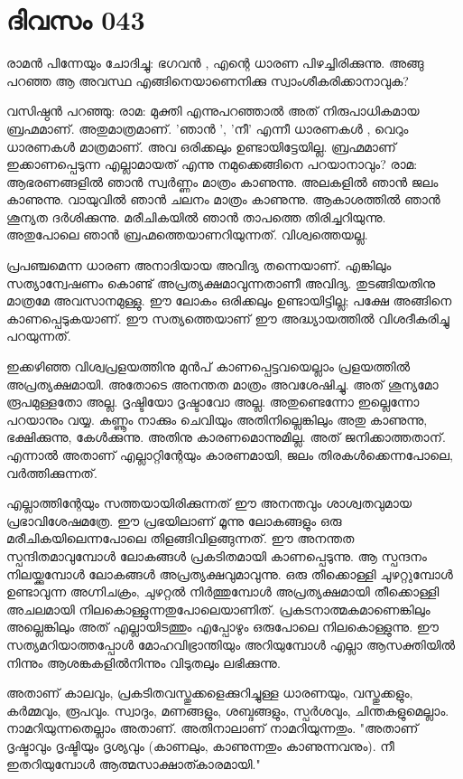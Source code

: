 \newpage
\section{ദിവസം 043}


രാമന്‍ പിന്നേയും ചോദിച്ചു: ഭഗവന്‍ , എന്റെ ധാരണ പിഴച്ചിരിക്കുന്നു. അങ്ങു പറഞ്ഞ ആ അവസ്ഥ എങ്ങിനെയാണെനിക്കു സ്വാംശീകരിക്കാനാവുക?

വസിഷ്ഠന്‍ പറഞ്ഞു: രാമ: മുക്തി എന്നുപറഞ്ഞാല്‍ അത്‌ നിരുപാധികമായ ബ്രഹ്മമാണ്‌. അതുമാത്രമാണ്‌.  'ഞാന്‍ ', 'നീ' എന്നീ ധാരണകള്‍ , വെറും ധാരണകള്‍ മാത്രമാണ്‌. അവ ഒരിക്കലും ഉണ്ടായിട്ടേയില്ല. ബ്രഹ്മമാണ്‌ ഇക്കാണപ്പെടുന്ന എല്ലാമായത്‌ എന്നു നമുക്കെങ്ങിനെ പറയാനാവും? രാമ: ആഭരണങ്ങളില്‍ ഞാന്‍ സ്വര്‍ണ്ണം മാത്രം കാണുന്നു. അലകളില്‍ ഞാന്‍ ജലം കാണുന്നു. വായുവില്‍ ഞാന്‍ ചലനം മാത്രം കാണുന്നു. ആകാശത്തില്‍ ഞാന്‍ ശൂന്യത ദര്‍ശിക്കുന്നു. മരീചികയില്‍ ഞാന്‍ താപത്തെ തിരിച്ചറിയുന്നു. അതുപോലെ ഞാന്‍ ബ്രഹ്മത്തെയാണറിയുന്നത്‌. വിശ്വത്തെയല്ല.

പ്രപഞ്ചമെന്ന ധാരണ അനാദിയായ അവിദ്യ തന്നെയാണ്‌. എങ്കിലും സത്യാന്വേഷണം കൊണ്ട്‌ അപ്രത്യക്ഷമാവുന്നതാണീ അവിദ്യ. തുടങ്ങിയതിനു മാത്രമേ അവസാനമുള്ളു. ഈ ലോകം ഒരിക്കലും ഉണ്ടായിട്ടില്ല; പക്ഷേ അങ്ങിനെ കാണപ്പെടുകയാണ്‌. ഈ സത്യത്തെയാണ്‌ ഈ അദ്ധ്യായത്തില്‍ വിശദീകരിച്ചു പറയുന്നത്‌. 

ഇക്കഴിഞ്ഞ വിശ്വപ്രളയത്തിനു മുന്‍പ്‌ കാണപ്പെട്ടവയെല്ലാം പ്രളയത്തില്‍ അപ്രത്യക്ഷമായി. അതോടെ അനന്തത മാത്രം അവശേഷിച്ചു. അത്‌ ശൂന്യമോ രൂപമുള്ളതോ അല്ല. ദൃഷ്ടിയോ ദൃഷ്ടാവോ അല്ല. അതുണ്ടെന്നോ ഇല്ലെന്നോ പറയാനും വയ്യ. കണ്ണൂം നാക്കും ചെവിയും അതിനില്ലെങ്കിലും അതു കാണുന്നു, ഭക്ഷിക്കുന്നു, കേള്‍ക്കുന്നു. അതിനു കാരണമൊന്നുമില്ല. അത്‌ ജനിക്കാത്തതാന്‌. എന്നാല്‍ അതാണ്‌ എല്ലാറ്റിന്റേയും കാരണമായി, ജലം തിരകള്‍ക്കെന്നപോലെ, വര്‍ത്തിക്കുന്നത്‌.

എല്ലാത്തിന്റേയും സത്തയായിരിക്കുന്നത്‌ ഈ അനന്തവും ശാശ്വതവുമായ പ്രഭാവിശേഷമത്രേ. ഈ പ്രഭയിലാണ്‌ മൂന്നു ലോകങ്ങളും ഒരു മരീചികയിലെന്നപോലെ തിളങ്ങിവിളങ്ങുന്നത്‌. ഈ അനന്തത സ്പന്ദിതമാവുമ്പോള്‍ ലോകങ്ങള്‍ പ്രകടിതമായി കാണപ്പെടുന്നു. ആ സ്പന്ദനം  നിലയ്ക്കുമ്പോള്‍ ലോകങ്ങള്‍ അപ്രത്യക്ഷവുമാവുന്നു. ഒരു തീക്കൊള്ളി ചുഴറ്റുമ്പോള്‍ ഉണ്ടാവുന്ന അഗ്നിചക്രം, ചുഴറ്റല്‍ നിര്‍ത്തുമ്പോള്‍ അപ്രത്യക്ഷമായി തീക്കൊള്ളി അചലമായി നിലകൊള്ളുന്നതുപോലെയാണിത്‌.  പ്രകടനാത്മകമാണെങ്കിലും  അല്ലെങ്കിലും അത്‌ എല്ലായിടത്തും എപ്പോഴും ഒരുപോലെ നിലകൊള്ളുന്നു. ഈ സത്യമറിയാത്തപ്പോള്‍ മോഹവിഭ്രാന്തിയും അറിയുമ്പോള്‍ എല്ലാ ആസക്തിയില്‍ നിന്നും ആശങ്കകളില്‍നിന്നും വിടുതലും ലഭിക്കുന്നു.

അതാണ്‌ കാലവും, പ്രകടിതവസ്തുക്കളെക്കുറിച്ചുള്ള ധാരണയും, വസ്തുക്കളും, കര്‍മ്മവും, രൂപവും. സ്വാദും, മണങ്ങളും, ശബ്ദങ്ങളും, സ്പര്‍ശവും, ചിന്തകളുമെല്ലാം. നാമറിയുന്നതെല്ലാം അതാണ്‌. അതിനാലാണ്‌ നാമറിയുന്നതും. "അതാണ്‌ ദൃഷ്ടാവും ദൃഷ്ടിയും ദൃശ്യവും (കാണലും, കാണുന്നതും കാണുന്നവനും). നീ ഇതറിയുമ്പോള്‍ ആത്മസാക്ഷാത്കാരമായി."

